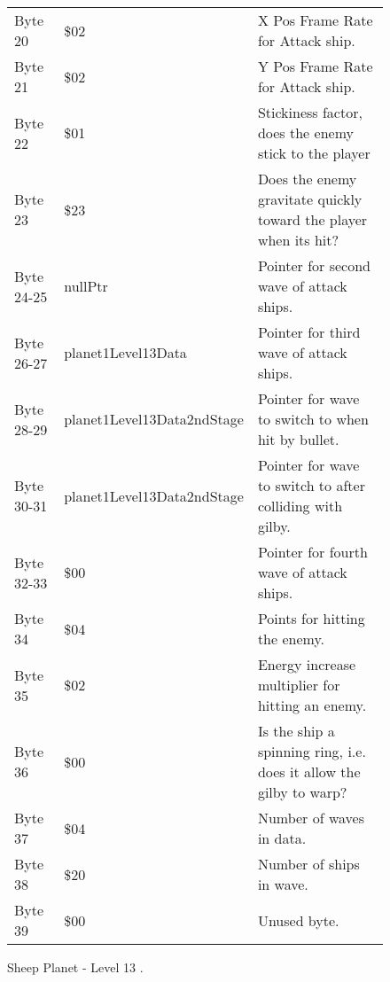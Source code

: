 \begin{figure}[H]
{\begin{adjustbox}{width=12cm}
\begin{tabular}{lll}
 Byte 20    & \$02                        & X Pos Frame Rate for Attack ship.                                   \\
 Byte 21    & \$02                        & Y Pos Frame Rate for Attack ship.                                   \\
 Byte 22    & \$01                        & Stickiness factor, does the enemy stick to the player               \\
 Byte 23    & \$23                        & Does the enemy gravitate quickly toward the player when its hit?    \\
 Byte 24-25 & nullPtr                    & Pointer for second wave of attack ships.                            \\
 Byte 26-27 & planet1Level13Data         & Pointer for third wave of attack ships.                             \\
 Byte 28-29 & planet1Level13Data2ndStage & Pointer for wave to switch to when hit by bullet.                   \\
 Byte 30-31 & planet1Level13Data2ndStage & Pointer for  wave to switch to after colliding with gilby.          \\
 Byte 32-33 & \$00                        & Pointer for fourth wave of attack ships.                            \\
 Byte 34    & \$04                        & Points for hitting the enemy.                                       \\
 Byte 35    & \$02                        & Energy increase multiplier for hitting an enemy.                    \\
 Byte 36    & \$00                        & Is the ship a spinning ring, i.e. does it allow the gilby to warp?  \\
 Byte 37    & \$04                        & Number of waves in data.                                            \\
 Byte 38    & \$20                        & Number of ships in wave.                                            \\
 Byte 39    & \$00                        & Unused byte.                                                        \\
\bottomrule
\end{tabular}

  \end{adjustbox}

  }\caption*{Sheep Planet - Level 13
.}
\end{figure}

